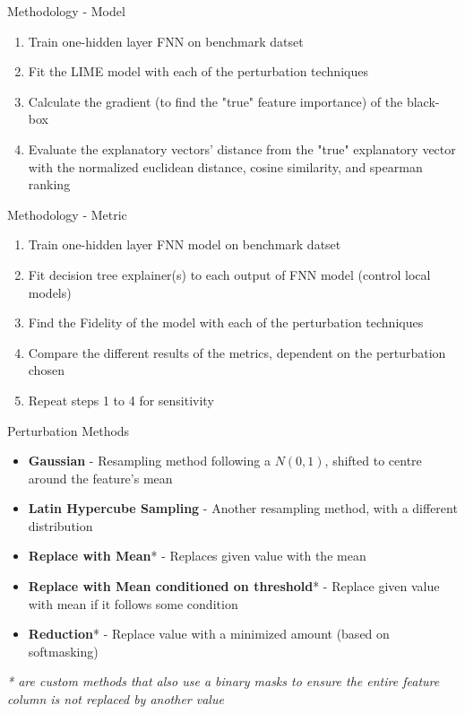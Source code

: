 \documentclass{beamer}
\begin{document}
\begin{frame}{Methodology - Model}
            \begin{enumerate}
                \item Train one-hidden layer FNN on benchmark datset
                \item Fit the LIME model with each of the perturbation techniques
                \item Calculate the gradient (to find the "true" feature importance) of the black-box
                \item Evaluate the explanatory vectors' distance from the "true" explanatory vector with the normalized euclidean distance, cosine similarity, and spearman ranking
            \end{enumerate}
\end{frame}

\begin{frame}{Methodology - Metric}
        \begin{enumerate}
            \item Train one-hidden layer FNN model on benchmark datset
            \item Fit decision tree explainer(s) to each output of FNN model (control local models)
            \item Find the Fidelity of the model with each of the perturbation techniques
            \item Compare the different results of the metrics, dependent on the perturbation chosen
            \item Repeat steps 1 to 4 for sensitivity
        \end{enumerate}
\end{frame}

\begin{frame}{Perturbation Methods}
    \begin{itemize}
        \item \textbf{Gaussian} - Resampling method following a $N(0, 1)$, shifted to centre around the feature's mean
        \item \textbf{Latin Hypercube Sampling} - Another resampling method, with a different distribution
        \item \textbf{Replace with Mean}* - Replaces given value with the mean
        \item \textbf{Replace with Mean conditioned on threshold}* - Replace given value with mean if it follows some condition 
        \item \textbf{Reduction}* - Replace value with a minimized amount (based on softmasking)
    \end{itemize}

    \vspace{0.5cm}

    \textit{* are custom methods that also use a binary masks to ensure the entire feature column is not replaced by another value}
\end{frame}
\end{document}
